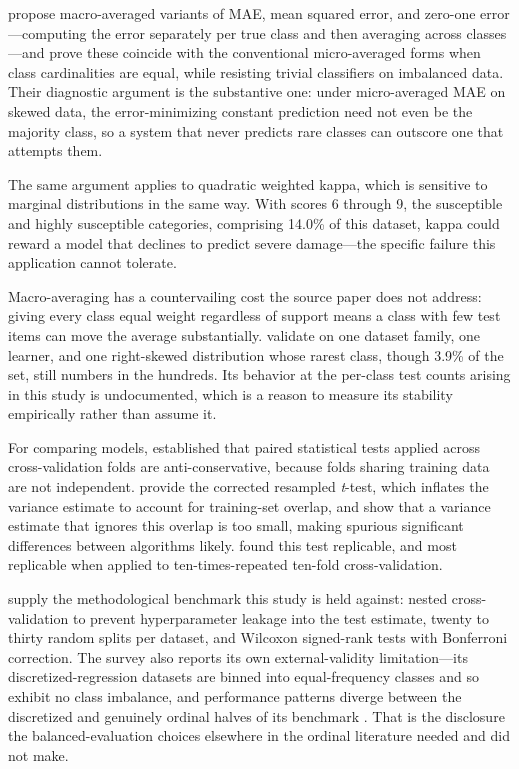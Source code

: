 \documentclass{icsthesis}
\begin{document}
\begin{mainmatter}
				\citet{baccianella2009} propose macro-averaged variants of MAE, mean squared error,
				and zero-one error---computing the error separately per true class and then
				averaging across classes---and prove these coincide with the conventional
				micro-averaged forms when class cardinalities are equal, while resisting trivial
				classifiers on imbalanced data. Their diagnostic argument is the substantive one:
				under micro-averaged MAE on skewed data, the error-minimizing constant prediction
				need not even be the majority class, so a system that never predicts rare classes
				can outscore one that attempts them.

				The same argument applies to quadratic weighted kappa, which is sensitive to
				marginal distributions in the same way. With scores 6 through 9, the susceptible and
				highly susceptible categories, comprising 14.0\% of this dataset, kappa could reward
				a model that declines to predict severe damage---the specific failure this
				application cannot tolerate.

				Macro-averaging has a countervailing cost the source paper does not address: giving
				every class equal weight regardless of support means a class with few test items can
				move the average substantially. \citet{baccianella2009} validate on one dataset
				family, one learner, and one right-skewed distribution whose rarest class, though
				3.9\% of the set, still numbers in the hundreds. Its behavior at the per-class test
				counts arising in this study is undocumented, which is a reason to measure its
				stability empirically rather than assume it.

				For comparing models, \citet{dietterich1998} established that paired statistical
				tests applied across cross-validation folds are anti-conservative, because folds
				sharing training data are not independent. \citet{nadeau2003} provide the corrected
				resampled \textit{t}-test, which inflates the variance estimate to account for
				training-set overlap, and show that a variance estimate that ignores this overlap
				is too small, making spurious significant differences between algorithms likely. \citet{bouckaert2004} found this test replicable, and most
				replicable when applied to ten-times-repeated ten-fold cross-validation.

				\citet{gutierrez2016} supply the methodological benchmark this study is held
				against: nested cross-validation to prevent hyperparameter leakage into the test
				estimate, twenty to thirty random splits per dataset, and Wilcoxon signed-rank tests
				with Bonferroni correction. The survey also reports its own external-validity
				limitation---its discretized-regression datasets are binned into equal-frequency
				classes and so exhibit no class imbalance, and performance patterns diverge between
				the discretized and genuinely ordinal halves of its benchmark \citep{gutierrez2016}.
				That is the disclosure the balanced-evaluation choices elsewhere in the ordinal
				literature needed and did not make.


\end{mainmatter}
\end{document}
